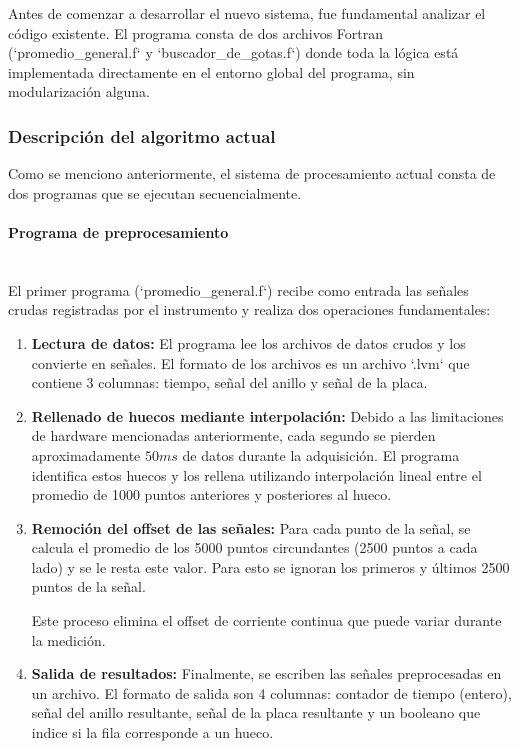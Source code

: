 \documentclass[12pt,a4paper]{article}
\newcommand{\subsubsubsection}[1]{\paragraph{#1}\mbox{}\\}
\begin{document}
Antes de comenzar a desarrollar el nuevo sistema, fue fundamental analizar el código existente. El programa consta de dos archivos Fortran (`promedio\_general.f` y `buscador\_de\_gotas.f`) donde toda la lógica está implementada directamente en el entorno global del programa, sin modularización alguna. 

\subsubsection{Descripción del algoritmo actual}
Como se menciono anteriormente, el sistema de procesamiento actual consta de dos programas que se ejecutan
secuencialmente.

\subsubsubsection{Programa de preprocesamiento}

El primer programa (`promedio\_general.f`) recibe como entrada las señales crudas registradas por el instrumento y realiza dos operaciones fundamentales:    

\begin{enumerate}


\item \textbf{Lectura de datos:} El programa lee los archivos de datos crudos y los convierte en señales. El formato de los archivos es un archivo `.lvm` que contiene 3 columnas: tiempo, señal del anillo y señal de la placa.

\item \textbf{Rellenado de huecos mediante interpolación:} Debido a las limitaciones de
hardware mencionadas anteriormente, cada segundo se pierden aproximadamente
$50ms$ de datos durante la adquisición. El programa identifica estos huecos y los
rellena utilizando interpolación lineal entre el promedio de 1000 puntos anteriores y posteriores al hueco.

\item \textbf{Remoción del offset de las señales:} Para cada punto de la señal, se calcula el
promedio de los 5000 puntos circundantes (2500 puntos a cada lado) y se le resta este
valor. Para esto se ignoran los primeros y últimos 2500 puntos de la señal.

Este proceso elimina el offset de corriente continua que puede variar durante la medición.

\item \textbf{Salida de resultados:} Finalmente, se escriben las señales preprocesadas en un archivo. El formato de salida son 4 columnas: contador de tiempo (entero), señal del anillo resultante, señal de la placa resultante y un booleano que indice si la fila corresponde a un hueco.

\end{enumerate}
\end{document}
